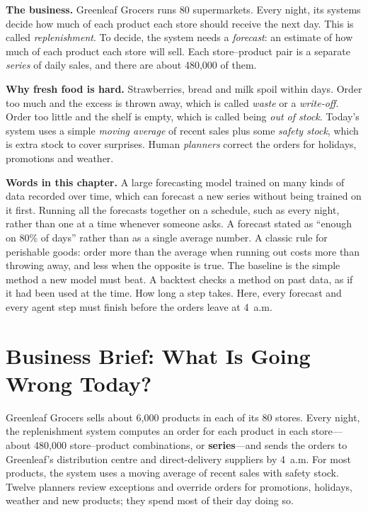 \begin{beforeyoustart}
\textbf{The business.} Greenleaf Grocers runs 80 supermarkets. Every night, its systems decide how much of each product each store should receive the next day. This is called \emph{replenishment}. To decide, the system needs a \emph{forecast}: an estimate of how much of each product each store will sell. Each store--product pair is a separate \emph{series} of daily sales, and there are about 480{,}000 of them.

\textbf{Why fresh food is hard.} Strawberries, bread and milk spoil within days. Order too much and the excess is thrown away, which is called \emph{waste} or a \emph{write-off}. Order too little and the shelf is empty, which is called being \emph{out of stock}. Today's system uses a simple \emph{moving average} of recent sales plus some \emph{safety stock}, which is extra stock to cover surprises. Human \emph{planners} correct the orders for holidays, promotions and weather.

\textbf{Words in this chapter.}
 A large forecasting model trained on many kinds of data recorded over time, which can forecast a new series without being trained on it first.
 Running all the forecasts together on a schedule, such as every night, rather than one at a time whenever someone asks.
 A forecast stated as ``enough on 80\% of days'' rather than as a single average number.
 A classic rule for perishable goods: order more than the average when running out costs more than throwing away, and less when the opposite is true.
 The baseline is the simple method a new model must beat. A backtest checks a method on past data, as if it had been used at the time.
 How long a step takes. Here, every forecast and every agent step must finish before the orders leave at 4~a.m.
\end{beforeyoustart}


\section{Business Brief: What Is Going Wrong Today?}
\label{sec:fc-brief}

Greenleaf Grocers sells about 6{,}000 products in each of its 80 stores. Every night, the replenishment system computes an order for each product in each store---about 480{,}000 store--product combinations, or \textbf{series}---and sends the orders to Greenleaf's distribution centre and direct-delivery suppliers by 4~a.m. For most products, the system uses a moving average of recent sales with safety stock. Twelve planners review exceptions and override orders for promotions, holidays, weather and new products; they spend most of their day doing so.


